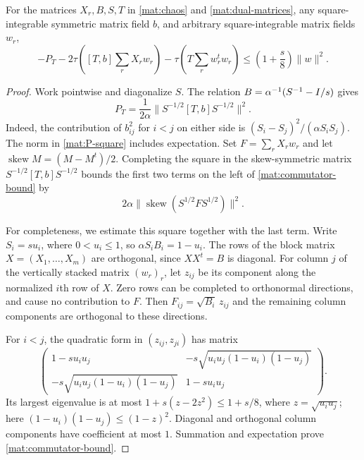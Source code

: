 \begin{lemma}\label{mat:commutator}
For the matrices $X_r,B,S,T$ in \eqref{mat:chaos} and
\eqref{mat:dual-matrices}, any square-integrable symmetric matrix field $b$, and arbitrary
square-integrable matrix fields $w_r$,
\begin{equation}\label{mat:commutator-bound}
 -P_T-2\tau\left([T,b]\sum_rX_rw_r\right)
       -\tau\left(T\sum_rw_r^tw_r\right)
 \le\left(1+\frac s8\right)\|w\|^2.
\end{equation}
\end{lemma}

\begin{proof}
Work pointwise and diagonalize $S$.  The relation
$B=\alpha^{-1}(S^{-1}-I/s)$ gives
\begin{equation}\label{mat:P-square}
 P_T=\frac1{2\alpha}
       \bigl\|S^{-1/2}[T,b]S^{-1/2}\bigr\|^2.
\end{equation}
Indeed, the contribution of $b_{ij}^2$ for $i<j$ on either side is
$(S_i-S_j)^2/(\alpha S_iS_j)$.  The norm in
\eqref{mat:P-square} includes expectation.
Set $F=\sum_rX_rw_r$ and let $\operatorname{skew}M=(M-M^t)/2$.
Completing the square in the skew-symmetric matrix
$S^{-1/2}[T,b]S^{-1/2}$ bounds the first two terms on the left of
\eqref{mat:commutator-bound} by
\[
 2\alpha\bigl\|\operatorname{skew}(S^{1/2}FS^{1/2})\bigr\|^2.
\]

For completeness, we estimate this square together with the last term.
Write $S_i=su_i$, where $0<u_i\le1$, so
$\alpha S_iB_i=1-u_i$.  The rows of the block matrix
$X=(X_1,\ldots,X_m)$ are orthogonal, since $XX^t=B$ is diagonal.
For column $j$ of the vertically stacked matrix $(w_r)_r$, let $z_{ij}$
be its component along the normalized $i$th row of $X$.  Zero rows can
be completed to orthonormal directions, and cause no contribution to
$F$.  Then $F_{ij}=\sqrt{B_i}\,z_{ij}$ and the remaining column
components are orthogonal to these directions.

For $i<j$, the quadratic form in $(z_{ij},z_{ji})$ has matrix
\[
 \begin{pmatrix}
 1-su_iu_j&-s\sqrt{u_iu_j(1-u_i)(1-u_j)}\\
 -s\sqrt{u_iu_j(1-u_i)(1-u_j)}&1-su_iu_j
 \end{pmatrix}.
\]
Its largest eigenvalue is at most
$1+s(z-2z^2)\le1+s/8$, where $z=\sqrt{u_iu_j}$; here
$(1-u_i)(1-u_j)\le(1-z)^2$.
Diagonal and orthogonal column components have coefficient at most
$1$.  Summation and expectation prove \eqref{mat:commutator-bound}.
\end{proof}

